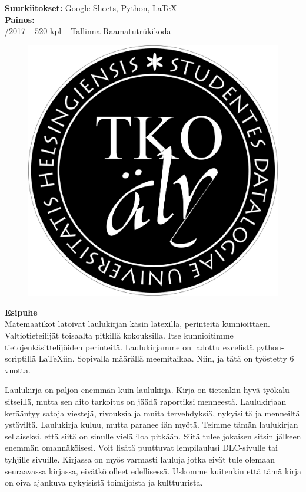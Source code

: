 \noindent
\textbf{Suurkiitokset:} Google Sheets, Python, \LaTeX \\

\noindent
\textbf{Painos:} \\
/2017 -- 520 kpl -- Tallinna Raamatutrükikoda \\
\newpage

\afterpage{\blankpage}
\begin{figure}[h!]
\centering
\includegraphics[scale=0.4]{graphics/logo.png}
\end{figure}

\newpage

\textbf{Esipuhe}
\\

Matemaatikot latoivat laulukirjan käsin latexilla, perinteitä kunnioittaen.
Valtiotieteilijät toisaalta pitkillä kokouksilla. Itse kunnioitimme
tietojenkäsittelijöiden perinteitä. Laulu\-kirjamme on ladottu excelistä
python-scriptillä \LaTeX{}iin. Sopivalla määrällä mee\-mi\-taikaa. Niin, ja tätä on työstetty 6 vuotta.

Laulukirja on paljon enemmän kuin laulukirja. Kirja on tieten\-kin hyvä työkalu
sitseillä, mutta sen aito tarkoitus on jäädä ra\-por\-tik\-si menneestä. Laulukirjaan
kerääntyy satoja viestejä, rivouksia ja muita tervehdyksiä, nykyisiltä ja
menneiltä ystäviltä. Laulukirja kuluu, mutta paranee iän myötä. Teimme tämän
laulukirjan sel\-lai\-sek\-si, että siitä on sinulle vielä iloa pitkään. Siitä tulee
jokaisen sitsin jälkeen enemmän omannäköisesi. Voit lisätä puuttuvat lempi\-laulusi DLC-sivulle tai tyhjille sivuille.
Kirjassa on myös varmasti lauluja jotka eivät tule olemaan seuraavassa
kirjassa, eivätkö olleet edellisessä. Uskomme kuitenkin että tämä kirja on oiva
ajankuva nykyisistä toimijoista ja kulttuurista.

